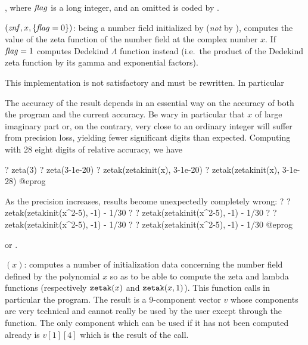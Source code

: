 , where $\hbox{\it f\kern0pt lag\/}$
is a long integer, and an omitted  is coded by .

$(\hbox{\it znf\/},x,\{\hbox{\it f\kern0pt lag\/}=0\})$:  being a number
field initialized by  (\emph{not} by ),
computes the value of the  zeta function of the number
field at the complex number $x$. If $\hbox{\it f\kern0pt lag\/}=1$ computes Dedekind $\Lambda$
function instead (i.e.~the product of the Dedekind zeta function by its gamma
and exponential factors).

 This implementation is not satisfactory and must be
rewritten. In particular

\item The accuracy of the result depends in an essential way on the
accuracy of both the  program and the current accuracy.
Be wary in particular that $x$ of large imaginary part or, on the
contrary, very close to an ordinary integer will suffer from precision
loss, yielding fewer significant digits than expected. Computing with 28
eight digits of relative accuracy, we have

\bprog
? zeta(3)
    ? zeta(3-1e-20)
    ? zetak(zetakinit(x), 3-1e-20)
    ? zetak(zetakinit(x), 3-1e-28)
@eprog

\item As the precision increases, results become unexpectedly
completely wrong:
\bprog
    ? 
    ? zetak(zetakinit(x^2-5), -1) - 1/30 
    ? 
    ? zetak(zetakinit(x^2-5), -1) - 1/30 
    ? 
    ? zetak(zetakinit(x^2-5), -1) - 1/30
    ? 
    ? zetak(zetakinit(x^2-5), -1) - 1/30
@eprog

 or
.

$(x)$: computes a number of initialization data
concerning the number field defined by the polynomial $x$ so as to be able
to compute the  zeta and lambda functions (respectively
${\tt zetak}(x)$ and ${\tt zetak}(x,1)$). This function calls in particular
the  program. The result is a 9-component vector $v$ whose
components are very technical and cannot really be used by the user except
through the  function. The only component which can be used if
it has not been computed already is $v[1][4]$ which is the result of the
 call.

